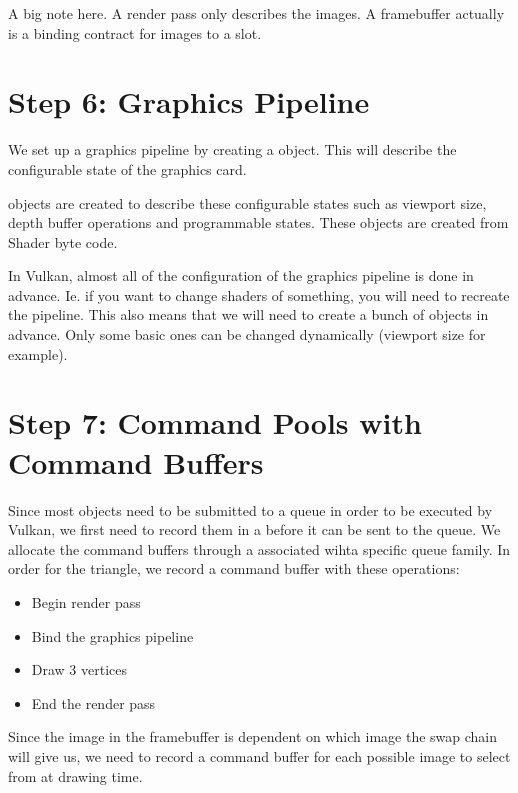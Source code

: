 \par A big note here. A render pass only describes the images. A framebuffer actually is a binding contract for images to a slot.

\section*{Step 6: Graphics Pipeline}
\par We set up a graphics pipeline by creating a  object. This will describe the configurable state of the graphics card. 

\par {} objects are created to describe these configurable states such as viewport size, depth buffer operations and programmable states. These objects are created from Shader byte code.

\par In Vulkan, almost all of the configuration of the graphics pipeline is done in advance. Ie. if you want to change shaders of something, you will need to recreate the pipeline. This also means that we will need to create a bunch of  objects in advance. Only some basic ones can be changed dynamically (viewport size for example).

\section*{Step 7: Command Pools with Command Buffers}
\par Since most objects need to be submitted to a queue in order to be executed by Vulkan, we first need to record them in a  before it can be sent to the queue. We allocate the command buffers through a  associated wihta  specific queue family. In order for the triangle, we record a command buffer with these operations:
\begin{itemize}
    \centering
    \item Begin render pass 
    \item Bind the graphics pipeline 
    \item Draw 3 vertices
    \item End the render pass
\end{itemize}
\par Since the image in the framebuffer is dependent on which image the swap chain will give us, we need to record a command buffer for each possible image to select from at drawing time.

